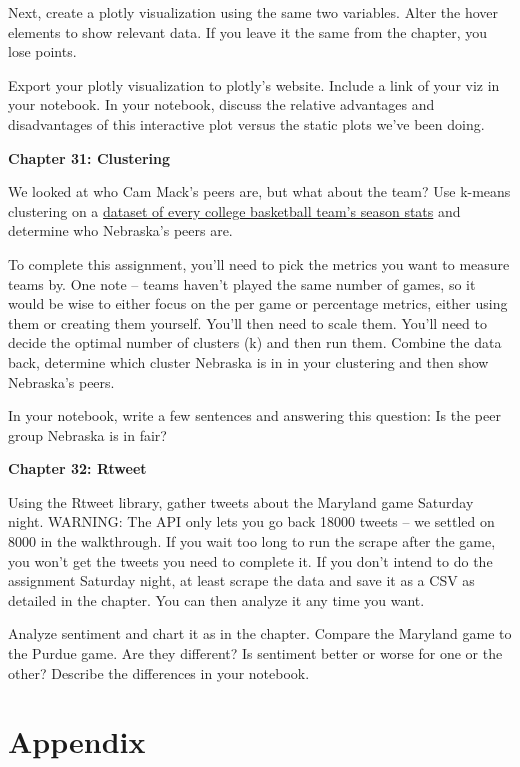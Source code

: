 \documentclass[]{book}
\begin{document}
Next, create a plotly visualization using the same two variables. Alter the hover elements to show relevant data. If you leave it the same from the chapter, you lose points.

Export your plotly visualization to plotly's website. Include a link of your viz in your notebook. In your notebook, discuss the relative advantages and disadvantages of this interactive plot versus the static plots we've been doing.

\textbf{Chapter 31: Clustering}

We looked at who Cam Mack's peers are, but what about the team? Use k-means clustering on a \href{https://unl.box.com/s/qdqu5rbz7f9jtk04fhuiqrb9p0nx5a0z}{dataset of every college basketball team's season stats} and determine who Nebraska's peers are.

To complete this assignment, you'll need to pick the metrics you want to measure teams by. One note -- teams haven't played the same number of games, so it would be wise to either focus on the per game or percentage metrics, either using them or creating them yourself. You'll then need to scale them. You'll need to decide the optimal number of clusters (k) and then run them. Combine the data back, determine which cluster Nebraska is in in your clustering and then show Nebraska's peers.

In your notebook, write a few sentences and answering this question: Is the peer group Nebraska is in fair?

\textbf{Chapter 32: Rtweet}

Using the Rtweet library, gather tweets about the Maryland game Saturday night. WARNING: The API only lets you go back 18000 tweets -- we settled on 8000 in the walkthrough. If you wait too long to run the scrape after the game, you won't get the tweets you need to complete it. If you don't intend to do the assignment Saturday night, at least scrape the data and save it as a CSV as detailed in the chapter. You can then analyze it any time you want.

Analyze sentiment and chart it as in the chapter. Compare the Maryland game to the Purdue game. Are they different? Is sentiment better or worse for one or the other? Describe the differences in your notebook.

\hypertarget{appendix}{%
\chapter{Appendix}\label{appendix}}
\end{document}
